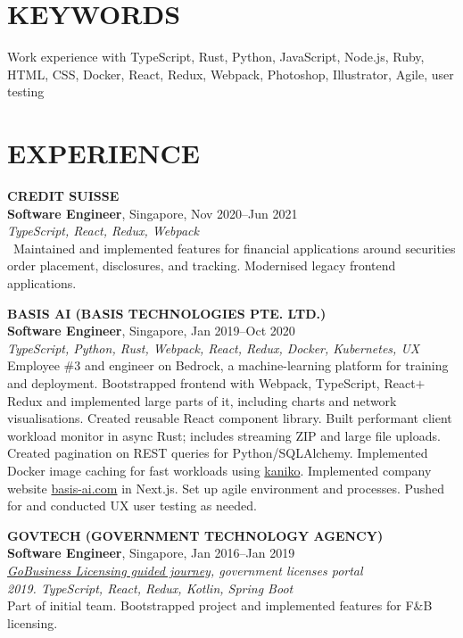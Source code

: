 \documentclass[line, margin]{res}
\makeatletter
\newcommand{\at}[0]{@}
\makeatother
\begin{document}
\address{
    \href{mailto:ng.guoyou+cv\at gmail.com}{ng.guoyou\at gmail.com}
    \href{https://github.com/gyng}{github.com/gyng}
}

\begin{resume}
    \section{KEYWORDS}
        Work experience with TypeScript, Rust, Python, JavaScript, Node.js, Ruby, HTML, CSS, Docker, React, Redux, Webpack, Photoshop, Illustrator, Agile, user testing

    \section{EXPERIENCE}
        \textbf{CREDIT SUISSE} \\
        \textbf{Software Engineer}, Singapore, Nov 2020--Jun 2021 \\
        \textit{TypeScript, React, Redux, Webpack} \\\
        Maintained and implemented features for financial applications around securities order placement, disclosures, and tracking. Modernised legacy frontend applications.
    
        \textbf{BASIS AI (BASIS TECHNOLOGIES PTE. LTD.)} \\
        \textbf{Software Engineer}, Singapore, Jan 2019--Oct 2020 \\
        \textit{TypeScript, Python, Rust, Webpack, React, Redux, Docker, Kubernetes, UX} \\
        Employee \#3 and engineer on Bedrock, a machine-learning platform for training and deployment.
        Bootstrapped frontend with Webpack, TypeScript, React$+$Redux and implemented large parts of it, including charts and network visualisations. Created reusable React component library.
        Built performant client workload monitor in async Rust; includes streaming ZIP and large file uploads. Created pagination on REST queries for Python/SQLAlchemy.
        Implemented Docker image caching for fast workloads using \href{https://github.com/GoogleContainerTools/kaniko}{kaniko}.
        Implemented company website \href{https://basis-ai.com/}{basis-ai.com} in Next.js.
        Set up agile environment and processes. Pushed for and conducted UX user testing as needed.

        \textbf{GOVTECH (GOVERNMENT TECHNOLOGY AGENCY)} \\
        \textbf{Software Engineer}, Singapore, Jan 2016--Jan 2019
        \\
        \textit{\href{https://www.gobusiness.gov.sg/licences/foodservices}{GoBusiness Licensing guided journey}, government licenses portal} \\
        \textit{2019. TypeScript, React, Redux, Kotlin, Spring Boot} \\
        Part of initial team. Bootstrapped project and implemented features for F\&B licensing.
        

\end{resume}
\end{document}
